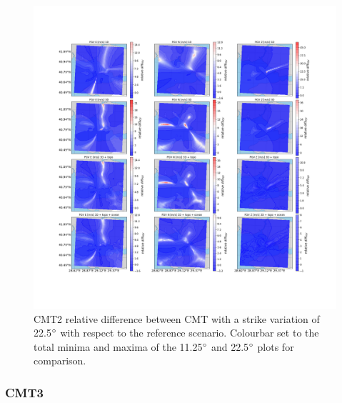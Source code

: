 \documentclass[../Text/00main.tex]{subfiles}
\begin{document}
\begin{figure}[!h]
    \centering
    \includegraphics[width=1\linewidth,trim = 2cm 5cm 1cm 5cm, clip]{images_results/strike_variation_epsilon25_sc2.png}
    \caption{CMT2 relative difference between CMT with a strike variation of 22.5$\degree$ with respect to the reference scenario. Colourbar set to the total minima and maxima of the 11.25$\degree$ and 22.5$\degree$ plots for comparison.}
    \label{fig:ref_eps25-2}
\end{figure}

\subsubsection{CMT3}
\end{document}
